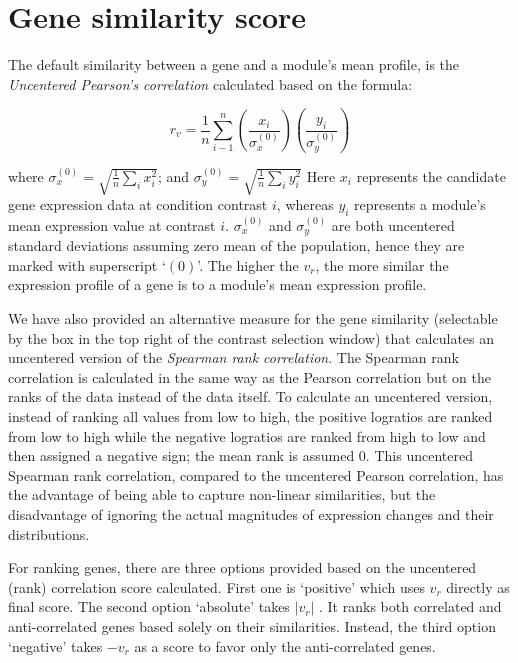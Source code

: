 \section{Gene similarity score}\label{apd:gene-score}

The default similarity between a gene and a module's mean
profile, is the \textit{Uncentered Pearson’s correlation} calculated based
on the formula:

\begin{equation}
r_v=\frac{1}{n}\sum_{i-1}^n(\dfrac{x_i}{\sigma_x^{(0)}})(\dfrac{y_i}{\sigma_y^{(0)}})
\end{equation}

where $\textstyle\sigma_x^{(0)}=\sqrt{\frac{1}{n}\sum\limits_{i}x_i^2}$; and 
$\textstyle\sigma_y^{(0)}=\sqrt{\frac{1}{n}\sum\limits_{i}y_i^2}$
Here $x_i$ represents the candidate gene expression data at
condition contrast $i$, whereas $y_i$ represents a module’s mean
expression value at contrast $i$. $\sigma_x^{(0)}$ and
$\sigma_y^{(0)}$ are both uncentered standard deviations assuming
zero mean of the population, hence they are marked with
superscript ‘$(0)$’. The higher the $v_r$, the more similar the
expression profile of a gene is to a module’s mean expression
profile.

We have also provided an alternative measure for the gene
similarity (selectable by the box in the top right of the
contrast selection window) that calculates an uncentered version
of the \textit{Spearman rank correlation}. The Spearman rank correlation
is calculated in the same way as the Pearson correlation but on
the ranks of the data instead of the data itself. To calculate an
uncentered version, instead of ranking all values from low to
high, the positive logratios are ranked from low to high while
the negative logratios are ranked from high to low and then
assigned a negative sign; the mean rank is assumed $0$.  This
uncentered Spearman rank correlation, compared to the uncentered
Pearson correlation, has the advantage of being able to capture
non-linear similarities, but the disadvantage of ignoring the
actual magnitudes of expression changes and their distributions.

For ranking genes, there are three options provided based on the
uncentered (rank) correlation score calculated. First one is
‘positive’ which uses $v_r$ directly as final score.  The second
option ‘absolute’ takes $|v_r|$ . It ranks both correlated and
anti-correlated genes based solely on their similarities. Instead, 
the third option ‘negative’ takes $-v_r$ as a score to favor only 
the anti-correlated genes.



